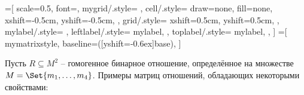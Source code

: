 \documentclass[a4paper,10pt]{article}
\begin{document}
\newenvironment{mygridscope}[1]{%
    \let\oldn\n
    \def\n{#1}

    \newcommand\drawcell[2][]{%
        \draw[cell, ##1] (##2) rectangle +(1,1); }
    \newcommand\drawcells[1]{%
        \foreach \i in {1,...,\n} {
            \foreach \j in {1,...,\n} {
                ##1
            }
        }
    }
    \newcommand\drawgrid[1][]{%
        \draw[grid, ##1] (0,0) grid (\n,\n); }
    \newcommand\drawleftlabels[2][]{%
        \foreach \i in {1,...,\n} {
            \node[leftlabel,##1] at (\i,0) {##2};
        }
    }
    \newcommand\drawtoplabels[2][]{%
        \foreach \i in {1,...,\n} {
            \node[toplabel,##1] at (0,\i) {##2};
        }
    }

    \begin{scope}[yshift=\n cm, rotate=-90]
    \begin{scope}[xshift=-0.5cm, yshift=-0.5cm]
    \begin{scope}[mygrid]
}{
    \end{scope}
    \end{scope}
    \end{scope}
    \let\n\oldn
}

\newcommand\drawlabelnorth[1]{%
    \node[above,align=center] at (current bounding box.north) {#1};
}
\newcommand\drawlabelsouth[1]{%
    \node[below,align=center] at (current bounding box.south) {#1};
}

=[
    scale=0.5,
    font=\small,
    mygrid/.style={
    },
    cell/.style={ %
        draw=none,
        fill=none,
        xshift=-0.5cm,
        yshift=-0.5cm,
    },
    grid/.style={ %
        xshift=0.5cm,
        yshift=0.5cm,
    },
    mylabel/.style={
    },
    leftlabel/.style={
        mylabel,
    },
    toplabel/.style={
        mylabel,
    },
]
=[
    mymatrixstyle,
    baseline={([yshift=-0.6ex]base)},
]

\def\matrixsize{4}

Пусть $R \subseteq M^2$ \--- гомогенное бинарное отношение, определённое на множестве $M = \Set{m_1, \dotsc, m_{\matrixsize}}$.
Примеры матриц отношений, обладающих некоторыми свойствами:
\end{document}
